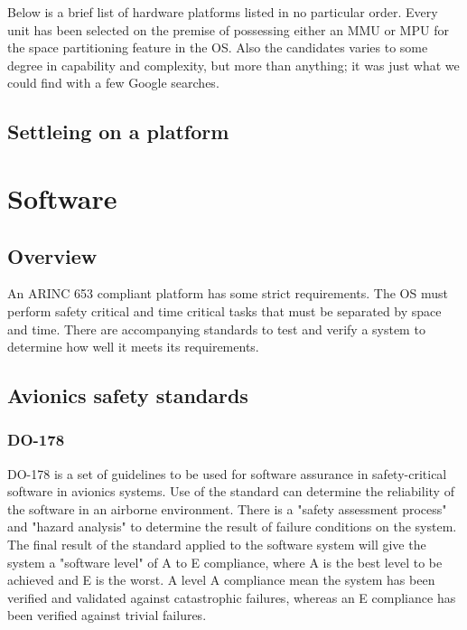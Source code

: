 Below is a brief list of hardware platforms listed in no particular order.
Every unit has been selected on the premise of possessing either an MMU or MPU for the space partitioning feature in the OS.
Also the candidates varies to some degree in capability and complexity,
but more than anything; it was just what we could find with a few Google searches.

\subsection{Settleing on a platform}


\section{Software}
\subsection{Overview}

An ARINC 653 compliant platform has some strict requirements. The OS must perform safety critical and time critical tasks that must be separated by space and time. There are accompanying standards to test and verify a system to determine how well it meets its requirements. 

\subsection{Avionics safety standards}
\subsubsection{DO-178}
DO-178 is a set of guidelines to be used for software assurance in safety-critical software in avionics systems. Use of the standard can determine the reliability of the software in an airborne environment. There is a "safety assessment process" and "hazard analysis" to determine the result of failure conditions on the system. The final result of the standard applied to the software system will give the system a "software level" of A to E compliance, where A is the best level to be achieved and E is the worst. A level A compliance mean the system has been verified and validated against catastrophic failures, whereas an E compliance has been verified against trivial failures.


